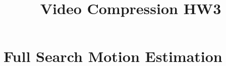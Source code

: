 \documentclass{homework}
\begin{document}
\title{Video Compression HW3}
\author{\chineseName \masterStudentID}
\date{}
\maketitle


\section*{Full Search Motion Estimation}
\end{document}
